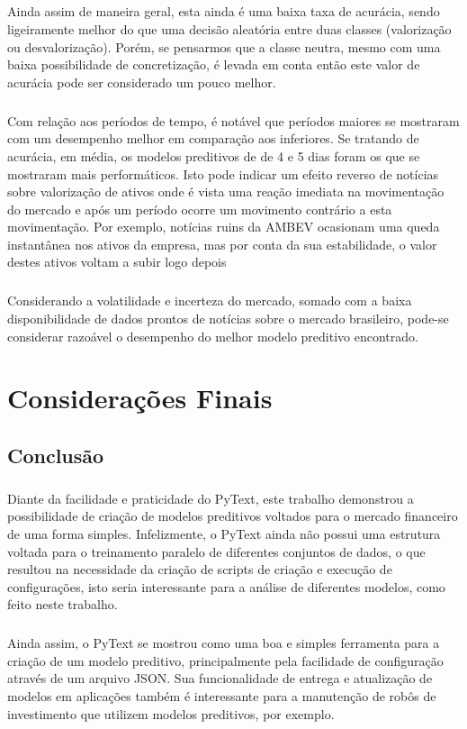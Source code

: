 \documentclass[grad,numbers]{coppe}
\begin{document}
	 				\paragraph{}Ainda assim de maneira geral, esta ainda é uma baixa taxa de acurácia, sendo ligeiramente melhor do que uma decisão aleatória entre duas classes (valorização ou desvalorização). Porém, se pensarmos que a classe neutra, mesmo com uma baixa possibilidade de concretização, é levada em conta então este valor de acurácia pode ser considerado um pouco melhor.
	 				\paragraph{}Com relação aos períodos de tempo, é notável que períodos maiores se mostraram com um desempenho melhor em comparação aos inferiores. Se tratando de acurácia, em média, os modelos preditivos de de 4 e 5 dias foram os que se mostraram mais performáticos. Isto pode indicar um efeito reverso de notícias sobre valorização de ativos onde é vista uma reação imediata na movimentação do mercado e após um período ocorre um movimento contrário a esta movimentação. Por exemplo, notícias ruins da AMBEV ocasionam uma queda instantânea nos ativos da empresa, mas por conta da sua estabilidade, o valor destes ativos voltam a subir logo depois
	 				\paragraph{}Considerando a volatilidade e incerteza do mercado, somado com a baixa disponibilidade de dados prontos de notícias sobre o mercado brasileiro, pode-se considerar razoável o desempenho do melhor modelo preditivo encontrado.
  
  \chapter{Considerações Finais}
  	\section{Conclusão}
  		\paragraph{}Diante da facilidade e praticidade do PyText, este trabalho demonstrou a possibilidade de criação de modelos preditivos voltados para o mercado financeiro de uma forma simples. Infelizmente, o PyText ainda não possui uma estrutura voltada para o treinamento paralelo de diferentes conjuntos de dados, o que resultou na necessidade da criação de scripts de criação e execução de configurações, isto seria interessante para a análise de diferentes modelos, como feito neste trabalho. \paragraph{}Ainda assim, o PyText se mostrou como uma boa e simples ferramenta para a criação de um modelo preditivo, principalmente pela facilidade de configuração através de um arquivo JSON. Sua funcionalidade de entrega e atualização de modelos em aplicações também é interessante para a manutenção de robôs de investimento que utilizem modelos preditivos, por exemplo.
\end{document}
